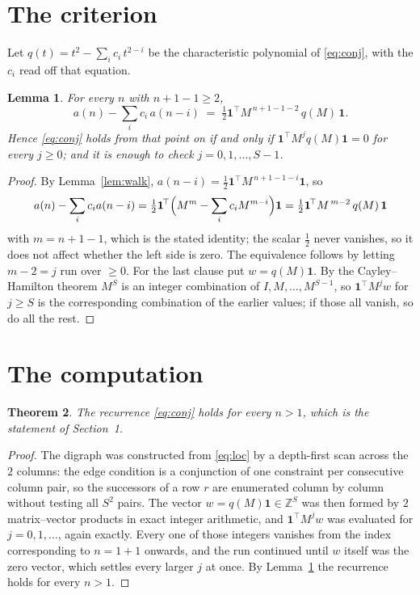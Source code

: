 \documentclass[11pt,a4paper]{article}
\theoremstyle{plain}
\newtheorem{theorem}{Theorem}
\newtheorem{lemma}[theorem]{Lemma}
\theoremstyle{definition}
\begin{document}
\section{The criterion}

Let $q(t)=t^{2}-\sum_i c_i\,t^{2-i}$ be the characteristic polynomial of
\eqref{eq:conj}, with the $c_i$ read off that equation.

\begin{lemma}\label{lem:crit}
For every $n$ with $n+1-1\ge2$,
\[
a(n)-\sum_i c_i\,a(n-i)\;=\;\tfrac1{2}\mathbf{1}^{\!\top}M^{\,n+1-1-2}\,q(M)\,\mathbf{1} .
\]
Hence \eqref{eq:conj} holds from that point on if and only if
$\mathbf{1}^{\!\top}M^{j}q(M)\mathbf{1}=0$ for every $j\ge0$; and it is enough to check
$j=0,1,\dots,S-1$.
\end{lemma}

\begin{proof}
By Lemma~\ref{lem:walk}, $a(n-i)=\tfrac1{2}\mathbf{1}^{\!\top}M^{\,n+1-1-i}\mathbf{1}$, so
\[
a(n)-\sum_i c_i a(n-i)
=\tfrac1{2}\mathbf{1}^{\!\top}\Bigl(M^{m}-\sum_i c_i M^{m-i}\Bigr)\mathbf{1}
=\tfrac1{2}\mathbf{1}^{\!\top}M^{\,m-2}\,q(M)\,\mathbf{1}
\]
with $m=n+1-1$, which is the stated identity; the scalar $\tfrac1{2}$ never vanishes, so
it does not affect whether the left side is zero. The equivalence follows by letting
$m-2=j$ run over $\ge0$. For the last clause put $w=q(M)\mathbf{1}$. By the
Cayley--Hamilton theorem $M^{S}$ is an integer combination of $I,M,\dots,M^{S-1}$, so
$\mathbf{1}^{\!\top}M^{j}w$ for $j\ge S$ is the corresponding combination of the earlier
values; if those all vanish, so do all the rest.
\end{proof}

\section{The computation}

\begin{theorem}
The recurrence \eqref{eq:conj} holds for every $n>1$, which is the statement of
Section~1.
\end{theorem}

\begin{proof}
The digraph was constructed from \eqref{eq:loc} by a depth-first scan across the $2$
columns: the edge condition is a conjunction of one constraint per consecutive column
pair, so the successors of a row $r$ are enumerated column by column without testing all
$S^2$ pairs. The vector $w=q(M)\mathbf{1}\in\mathbb{Z}^{S}$ was then formed by $2$
matrix--vector products in exact integer arithmetic, and $\mathbf{1}^{\!\top}M^{j}w$ was
evaluated for $j=0,1,\dots$, again exactly. Every one of those integers vanishes from the
index corresponding to $n=1+1$ onwards, and the run continued until $w$ itself was the
zero vector, which settles every larger $j$ at once. By Lemma~\ref{lem:crit} the recurrence
holds for every $n>1$.
\end{proof}
\end{document}
